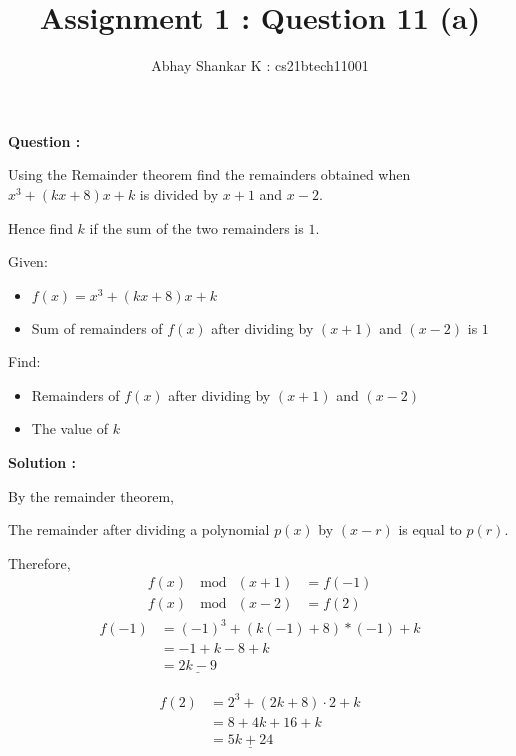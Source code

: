 \documentclass[11pt, oneside, twocolumn, reqno]{amsart}   	%
\title{Assignment 1 : Question 11 (a)}
\author{Abhay Shankar K : cs21btech11001}
\begin{document}
\maketitle
\textbf{Question :}

Using the Remainder theorem find the remainders obtained when $x^3 + (kx + 8)x + k$ is divided by $x + 1$ and $x - 2$.

Hence find $k$ if the sum of the two remainders is $1$.

Given:
\begin{itemize}
	\item $f(x) = x^3 + (kx + 8)x + k$ 
	\item Sum of remainders of $f(x)$ after dividing by $(x + 1)$ and $(x - 2)$ is $1$
\end{itemize}
Find:
\begin{itemize}
	\item Remainders of $f(x)$ after dividing by $(x + 1)$ and $(x - 2)$
	\item The value of $k$
\end{itemize}

\textbf{Solution :}

By the remainder theorem,

	 The remainder after dividing a polynomial $p(x)$ by $(x - r)$ is equal to $p(r)$.

	 Therefore,
	\begin{align}
  		f(x)\ \mod\ (x + 1) &= f(-1) \\
  		f(x)\ \mod\ (x - 2) &= f(2)
	\end{align}
	\begin{align}
 		f(-1) &= (-1)^3 + (k(-1) + 8)*(-1) + k \\
		 &= -1 + k - 8 + k \\
		 &= \underline{2k - 9}
	\end{align}
		
	\begin{align}
		f(2) &= 2^3 + (2k + 8) \cdot 2 + k \\
		  &= 8 + 4k + 16 + k \\
		 &= \underline{5k + 24}
	\end{align}
		  
\end{document}
